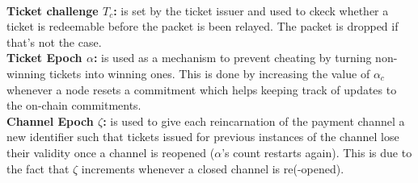     \\\textbf{Ticket challenge $T_c$:}  is set by the ticket issuer and used to ckeck whether a ticket is redeemable before the packet is been relayed. The packet is dropped if that's not the case.
    \\\textbf{Ticket Epoch $\alpha$:} is used as a mechanism to prevent cheating by turning non-winning tickets into winning ones. This is done by increasing the value of $\alpha_c$ whenever a node resets a commitment which helps keeping track of updates to the on-chain commitments.
    \\\textbf{Channel Epoch $\zeta$:} is used to give each reincarnation of the payment channel a new identifier such that tickets issued for previous instances of the channel lose their validity once a channel is reopened ($\alpha$'s count restarts again). This is due to the fact that $\zeta$ increments whenever a closed channel is re(-opened).
    \begin{comment}
        
   
    \\\textbf{ChainId $c_{Id}$:} The channel identifier which is defined by the ticket issuer in order to determine which channel will be used between issuer and recipient. For example, tickets that are valid on xDAI are not valid on Ethereum.
    \\\textbf{Tag $\tau$} is given as a constant and depends on the utilized blockchain. It is used to distinguish HOPR tickets from others with the same structure that are meant for different payment channels and invalidates their usage in HOPR.
    \\\textbf{Version $V$} is given as a constant and depends on the utilized blockchain. It is used to invalidate tickets that were issued for previous versions of HOPR from being used in future iterations of the protocol.

\end{comment}

